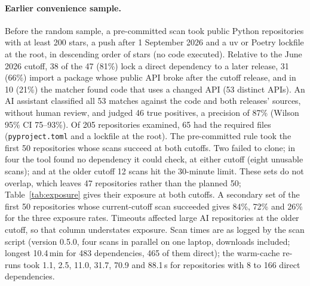 \documentclass[11pt]{article}
\newcommand{\code}[1]{\texttt{#1}}
\begin{document}
\paragraph{Earlier convenience sample.}
Before the random sample, a pre-committed scan took public Python repositories with at least 200 stars, a push after 1 September 2026 and a uv or Poetry lockfile at the root, in descending order of stars (no code executed).
Relative to the June 2026 cutoff, 38 of the 47 (81\%) lock a direct dependency to a later release, 31 (66\%) import a package whose public API broke after the cutoff release, and in 10 (21\%) the matcher found code that uses a changed API (53 distinct APIs).
An AI assistant classified all 53 matches against the code and both releases' sources, without human review, and judged 46 true positives, a precision of 87\% (Wilson 95\% CI 75--93\%).
Of 205 repositories examined, 65 had the required files (\code{pyproject.toml} and a lockfile at the root).
The pre-committed rule took the first 50 repositories whose scans succeed at both cutoffs.
Two failed to clone; in four the tool found no dependency it could check, at either cutoff (eight unusable scans); and at the older cutoff 12 scans hit the 30-minute limit.
These sets do not overlap, which leaves 47 repositories rather than the planned 50; Table~\ref{tab:exposure} gives their exposure at both cutoffs.
A secondary set of the first 50 repositories whose current-cutoff scan succeeded gives 84\%, 72\% and 26\% for the three exposure rates.
Timeouts affected large AI repositories at the older cutoff, so that column understates exposure.
Scan times are as logged by the scan script (version 0.5.0, four scans in parallel on one laptop, downloads included; longest 10.4\,min for 483 dependencies, 465 of them direct); the warm-cache re-runs took 1.1, 2.5, 11.0, 31.7, 70.9 and 88.1\,s for repositories with 8 to 166 direct dependencies.
\end{document}
